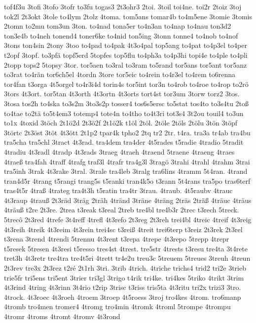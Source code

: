 {tof4f3u
3tofi
3tofo
3tofr
to3fu
togas3
2t3ohr3
2toi.
3toil
toi4ne.
toi2r
2toiz
3toj
tok2l
2t3okt
3tole
to4lym
2tolz
4toma.
tom5ans
tomar4b
to4m5ene
3tomie
3tomis
2tomn
to2mu
tom3un
3ton.
to4nad
tona5er
to4n3an
to4nap
to4nau
ton3d2
ton3e4b
to4neh
tonend4
toner6ke
to4nid
ton5ing
3tonn
tonne4
to4nob
to4nof
3tons
ton4sin
2tony
3too
to4pad
to4pak
4t3o4pal
top5ang
to4pat
to4p3el
to4per
t2opf
3topf.
to3pfä
topf5erd
5topfes
top5flu
to4ph3a
to4p3hi
topi4e
to4ple
to4pli
2topp
tops2
5topsy
3tor.
tor5aen
to3ral
to3ram
to5rand
tor5ans
tor5ant
tor5anz
to3rat
to4rän
tor6ch5el
4tordn
3tore
tor5eic
to4rein
to4r3el
to4rem
to6renna
tor4fan
t3orga
4t5orgel
to4r3i4d
torin4s
tor5int
tor3n
to4rob
to4roe
to4rop
to2rö
3tors
4t3ort.
tor5tan
4t3orth
4t3ortn
4t3orts
tort4st
tor3um
3torw
torz2
3tos.
3tosa
tos2h
to4ska
to3s2m
3to3s2p
tosser4
tos6s5ersc
to5stat
tos4to
to3s4tu
2toß
to4tae
to2tä
to5t4em3
totemp4
tote4n
to4tho
to4t3ri
tot3s4
3t2ou
touil4
to3un
to1x
4toxid
3töch
2t1ö2d
2t3ö2f
2t1ö2k
t1öl
2töl.
2töle
2töls
2tölu
3tön
3töpf
3törtc
2t3öst
3töt
4t3ött
2t1p2
tpar4k
tpho2
2tq
tr2
2tr.
t4ra.
tra3a
tr4ab
tra4bu
tra5cha
tra5chl
3tract
4t3rad.
tra4dem
tra4der
4t5rades
t5radie
4tradio
5tradit
4tradiu
4t3radl
4tradp
4t3rads
3traeg
4traeh
4traend
5traene
4traeng
4traes
4traeß
tra4fah
4traff
4trafg
traf3l
4trafr
tra4g3l
3tragö
3trahi
4trahl
4trahm
3trai
tra5inh
3trak
4t3rake
3tral.
3trale
tra4leb
3tralg
tra6lins
4tramm
5t4ran.
4trand
tran4d5r
4trang
t5rangi
trang5s
t5ranki
tran4k5o
t3rann
5t4rans
tra5po
tras6terf
tras4t5r
4traß
4trateg
tra4t3h
t5ratin
tra4tr
3trau.
4traub.
4t5raubv
4trauc
4t3raup
4trauß
2t3räd
3träg
2träh
4tränd
3träne
4träng
2träs
2träß
4träuc
4träus
4träuß
t2re
2t3re.
2trea
t3reak
t3real
2treb
tre4bl
tre4b3r
2trec
t3rech
5treck.
5trecô
2t3red
4trefe
3t4reff
4trefl
4t3refo
2t3reg
2t3reh
trei4bl
4treic
4treif
4t3reig
4t3reih
4treik
4t3reim
4t3rein
trei4sc
t3reiß
4treit
trei6terp
t3reiz
2t3rek
2t3rel
t3rena
3trend
4trendi
5trennu
4t3rent
t3repa
4trepe
4t3repo
5trepp
4trepr
t5resek
5tresen
4t3resi
t5resso
tres4st
4trest.
tre5str
4trests
t3resu
tre4ta
3t4rete
tret3h
4t3retr
tre4tra
tre4t5ri
4trett
tr4e2u
treu3c
5treuem
5treues
3treuh
4treun
2t3rev
tre3x
2t3rez
t2ré
2t1rh
3tri.
3trib
4trich.
4triche
trichs4
trid2
tri2e
3trieb
trie5fr
tri5ens
tri5ent
3trier
tri3gl
3trigo
t4rik
tri4ke.
tri4kes
5triko
4trikt
3trim
4t3rind
4tring
4t3rinn
3t4rio
t2rip
3trisc
t3riss
tris5ta
4t3ritu
tri2x
trizi3
3tro.
4trock.
4t3roec
4t3roeh
4troem
3troep
4t5roess
3troj
tro4kes
4trom.
tro6manp
4tromb
tro4men
tromer4
4tromg
tro4min
4tromk
4troml
5trompe
4trompu
4tromr
4troms
4tromt
4tromv
4t3rond
}
